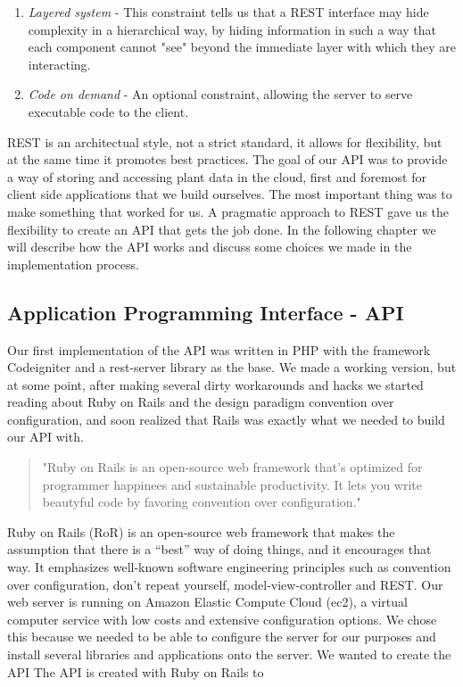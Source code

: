 \begin{enumerate}
\item{} \emph{Layered system} - This constraint tells us that a REST interface may hide complexity in a hierarchical way, by hiding information in such a way that each component cannot "see" beyond the immediate layer with which they are interacting. \citep{fielding2000architectural}

\item{} \emph{Code on demand} - An optional constraint, allowing the server to serve executable code to the client. 

\end{enumerate}

REST is an architectual style, not a strict standard, it allows for flexibility, but at the same time it promotes best practices. The goal of our API was to provide a way of storing and accessing plant data in the cloud, first and foremost for client side applications that we build ourselves. The most important thing was to make something that worked for us. A pragmatic approach to REST gave us the flexibility to create an API that gets the job done. In the following chapter we will describe how the API works and discuss some choices we made in the implementation process.

\subsection{Application Programming Interface - API}
Our first implementation of the API was written in PHP with the framework Codeigniter and a rest-server library as the base. We made a working version, but at some point, after making several dirty workarounds and hacks we started reading about Ruby on Rails and the design paradigm convention over configuration, and soon realized that Rails was exactly what we needed to build our API with.

\begin{quote}
"Ruby on Rails is an open-source web framework that’s optimized for programmer happinees and sustainable productivity. It lets you write beautyful code by favoring convention over configuration."\citep{rubyonrails.org} 
\end{quote}

Ruby on Rails (RoR) is an open-source web framework that makes the assumption that there is a “best” way of doing things, and it encourages that way. It emphasizes well-known software engineering principles such as convention over configuration, don't repeat yourself, model-view-controller and REST.
 Our web server is running on Amazon Elastic Compute Cloud (ec2), a virtual computer service with low costs and extensive configuration options. We chose this because we needed to be able to configure the server for our purposes and install several libraries and applications onto the server. We wanted to create the API The API is created with Ruby on Rails to 

